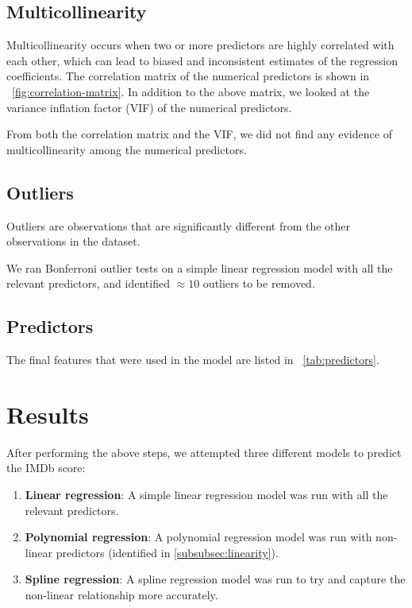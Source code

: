\documentclass[12pt,a4paper]{article}
\begin{document}
\subsection{Multicollinearity}\label{subsec:multicollinearity}
Multicollinearity occurs when two or more predictors are highly correlated with each other, which can lead to biased and inconsistent estimates of the regression coefficients.
The correlation matrix of the numerical predictors is shown in \figurename~\ref{fig:correlation-matrix}.
In addition to the above matrix, we looked at the variance inflation factor (VIF) of the numerical predictors.

From both the correlation matrix and the VIF, we did not find any evidence of multicollinearity among the numerical predictors.

\subsection{Outliers}\label{subsec:outliers}
Outliers are observations that are significantly different from the other observations in the dataset.

We ran Bonferroni outlier tests on a simple linear regression model with all the relevant predictors, and identified $\approx 10$ outliers to be removed.

\subsection{Predictors}\label{subsec:predictors}
The final features that were used in the model are listed in \tablename~\ref{tab:predictors}.

\section{Results}\label{sec:results}
After performing the above steps, we attempted three different models to predict the IMDb score:
\begin{enumerate}
    \item \textbf{Linear regression}: A simple linear regression model was run with all the relevant predictors.
    \item \textbf{Polynomial regression}: A polynomial regression model was run with non-linear predictors (identified in \ref{subsubsec:linearity}).
    \item \textbf{Spline regression}: A spline regression model was run to try and capture the non-linear relationship more accurately.
\end{enumerate}
\end{document}
